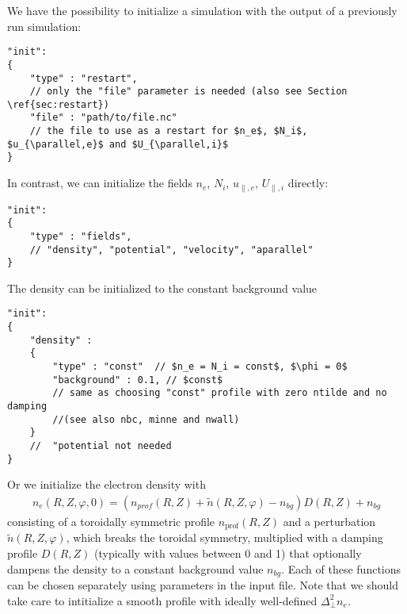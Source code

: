 We have the possibility to
initialize a simulation with the output of a previously
run simulation:
\begin{verbatim}
"init":
{
    "type" : "restart",
    // only the "file" parameter is needed (also see Section \ref{sec:restart})
    "file" : "path/to/file.nc"
    // the file to use as a restart for $n_e$, $N_i$, $u_{\parallel,e}$ and $U_{\parallel,i}$
}
\end{verbatim}
In contrast, we can initialize the fields $n_e$, $N_i$, $u_{\parallel,e}$, $U_{\parallel,i}$
directly:
\begin{verbatim}
"init":
{
    "type" : "fields",
    // "density", "potential", "velocity", "aparallel"
}
\end{verbatim}
The density can be initialized to the constant background value
\begin{verbatim}
"init":
{
    "density" :
    {
        "type" : "const"  // $n_e = N_i = const$, $\phi = 0$
        "background" : 0.1, // $const$
        // same as choosing "const" profile with zero ntilde and no damping
        //(see also nbc, minne and nwall)
    }
    //  "potential not needed
}
\end{verbatim}
Or we initialize the electron density with
\begin{align} \label{eq:initial_ne}
    n_e(R,Z,\varphi, 0)= (n_{prof}(R,Z) + \tilde n(R,Z,\varphi) - n_{bg}) D(R,Z) + n_{bg}
\end{align}
consisting of a toroidally symmetric profile $n_{\text{prof}}(R,Z)$ and a
perturbation $\tilde n(R,Z,\varphi)$, which breaks the toroidal symmetry,
multiplied with a damping profile $D(R,Z)$ (typically with values between 0 and
1) that optionally dampens the density to a constant background value $n_{bg}$.
Each of these functions can be chosen separately using parameters in the input
file.  Note that we should take care to intitialize a smooth profile with
ideally well-defined $\Delta^2_\perp n_e$.

